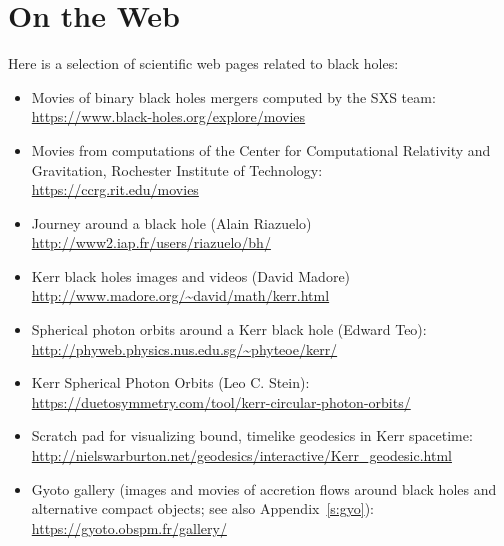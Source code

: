 \chapter{On the Web} \label{s:web}

\minitoc

Here is a selection of scientific web pages related to black holes:

\begin{itemize}
\item Movies of binary black holes mergers computed by the SXS team:\\
\url{https://www.black-holes.org/explore/movies}
\item Movies from computations of the Center for Computational Relativity
and Gravitation, Rochester Institute of Technology:\\
\url{https://ccrg.rit.edu/movies}
\item Journey around a black hole (Alain Riazuelo)\\
\url{http://www2.iap.fr/users/riazuelo/bh/}
\item Kerr black holes images and videos (David Madore)\\
\url{http://www.madore.org/~david/math/kerr.html}
\item Spherical photon orbits around a Kerr black hole (Edward Teo):\\
\url{http://phyweb.physics.nus.edu.sg/~phyteoe/kerr/}
\item Kerr Spherical Photon Orbits (Leo C. Stein):\\
\url{https://duetosymmetry.com/tool/kerr-circular-photon-orbits/}
\item Scratch pad for visualizing bound, timelike geodesics in Kerr spacetime:\\
\url{http://nielswarburton.net/geodesics/interactive/Kerr_geodesic.html}
\item Gyoto gallery (images and movies of accretion flows around black holes and alternative
compact objects; see also Appendix~\ref{s:gyo}): \\
\url{https://gyoto.obspm.fr/gallery/}
\end{itemize}

